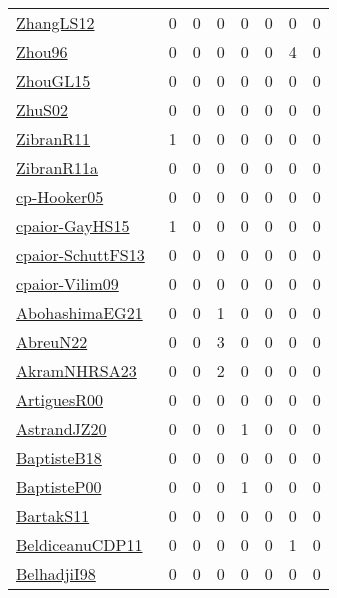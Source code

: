 {\begin{longtable}{l*{7}{r}}
\href{papers/ZhangLS12.pdf}{ZhangLS12}~\cite{ZhangLS12} & 0 & 0 & 0 & 0 & 0 & 0 & 0\\
\href{papers/Zhou96.pdf}{Zhou96}~\cite{Zhou96} & 0 & 0 & 0 & 0 & 0 & 4 & 0\\
\href{papers/ZhouGL15.pdf}{ZhouGL15}~\cite{ZhouGL15} & 0 & 0 & 0 & 0 & 0 & 0 & 0\\
\href{papers/ZhuS02.pdf}{ZhuS02}~\cite{ZhuS02} & 0 & 0 & 0 & 0 & 0 & 0 & 0\\
\href{papers/ZibranR11.pdf}{ZibranR11}~\cite{ZibranR11} & 1 & 0 & 0 & 0 & 0 & 0 & 0\\
\href{papers/ZibranR11a.pdf}{ZibranR11a}~\cite{ZibranR11a} & 0 & 0 & 0 & 0 & 0 & 0 & 0\\
\href{papers/cp-Hooker05.pdf}{cp-Hooker05}~\cite{cp-Hooker05} & 0 & 0 & 0 & 0 & 0 & 0 & 0\\
\href{papers/cpaior-GayHS15.pdf}{cpaior-GayHS15}~\cite{cpaior-GayHS15} & 1 & 0 & 0 & 0 & 0 & 0 & 0\\
\href{papers/cpaior-SchuttFS13.pdf}{cpaior-SchuttFS13}~\cite{cpaior-SchuttFS13} & 0 & 0 & 0 & 0 & 0 & 0 & 0\\
\href{papers/cpaior-Vilim09.pdf}{cpaior-Vilim09}~\cite{cpaior-Vilim09} & 0 & 0 & 0 & 0 & 0 & 0 & 0\\
\href{articles/AbohashimaEG21.pdf}{AbohashimaEG21}~\cite{AbohashimaEG21} & 0 & 0 & 1 & 0 & 0 & 0 & 0\\
\href{articles/AbreuN22.pdf}{AbreuN22}~\cite{AbreuN22} & 0 & 0 & 3 & 0 & 0 & 0 & 0\\
\href{articles/AkramNHRSA23.pdf}{AkramNHRSA23}~\cite{AkramNHRSA23} & 0 & 0 & 2 & 0 & 0 & 0 & 0\\
\href{articles/ArtiguesR00.pdf}{ArtiguesR00}~\cite{ArtiguesR00} & 0 & 0 & 0 & 0 & 0 & 0 & 0\\
\href{articles/AstrandJZ20.pdf}{AstrandJZ20}~\cite{AstrandJZ20} & 0 & 0 & 0 & 1 & 0 & 0 & 0\\
\href{articles/BaptisteB18.pdf}{BaptisteB18}~\cite{BaptisteB18} & 0 & 0 & 0 & 0 & 0 & 0 & 0\\
\href{articles/BaptisteP00.pdf}{BaptisteP00}~\cite{BaptisteP00} & 0 & 0 & 0 & 1 & 0 & 0 & 0\\
\href{articles/BartakS11.pdf}{BartakS11}~\cite{BartakS11} & 0 & 0 & 0 & 0 & 0 & 0 & 0\\
\href{articles/BeldiceanuCDP11.pdf}{BeldiceanuCDP11}~\cite{BeldiceanuCDP11} & 0 & 0 & 0 & 0 & 0 & 1 & 0\\
\href{articles/BelhadjiI98.pdf}{BelhadjiI98}~\cite{BelhadjiI98} & 0 & 0 & 0 & 0 & 0 & 0 & 0\\

\end{longtable}}
